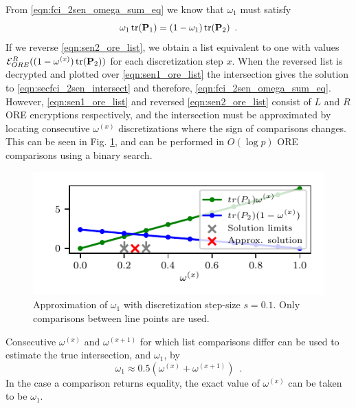 \documentclass[letterpaper, 10 pt, conference]{ieeeconf}  %
\begin{document}
From \eqref{eqn:fci_2sen_omega_sum_eq} we know that $\omega_1$ must satisfy
\begin{equation}
   \omega_1 \operatorname{tr}({{\mathbf{P}}}_1) = (1-\omega_1)\operatorname{tr}({{\mathbf{P}}}_2)\enspace. \label{eqn:secfci_2sen_intersect}
\end{equation}
If we reverse \eqref{eqn:sen2_ore_list}, we obtain a list equivalent to one with values $\mathcal{E}^R_{ORE}((1-\omega^{(x)})\operatorname{tr}({{\mathbf{P}}}_2))$ for each discretization step $x$. When the reversed list is decrypted and plotted over \eqref{eqn:sen1_ore_list} the intersection gives the solution to \eqref{eqn:secfci_2sen_intersect} and therefore, \eqref{eqn:fci_2sen_omega_sum_eq}. However, \eqref{eqn:sen1_ore_list} and reversed \eqref{eqn:sen2_ore_list} consist of $L$ and $R$ ORE encryptions respectively, and the intersection must be approximated by locating consecutive $\omega^{(x)}$ discretizations where the sign of comparisons changes. This can be seen in Fig. \ref{fig:2_sensor_sol}, and can be performed in $O(\log{p})$ ORE comparisons using a binary search.
\begin{figure}[tb]
   \vspace{-5pt}
   \begin{center}
      \includegraphics{images/2_sensors.pdf}
   \end{center}
   \vspace{-15pt}
   \caption{Approximation of $\omega_1$ with discretization step-size $s=0.1$. Only comparisons between line points are used.}
   \vspace{-\baselineskip}
   \label{fig:2_sensor_sol}
\end{figure}
Consecutive $\omega^{(x)}$ and $\omega^{(x+1)}$ for which list comparisons differ can be used to estimate the true intersection, and $\omega_1$, by
\begin{equation}
   \omega_1 \approx 0.5(\omega^{(x)} + \omega^{(x+1)})\enspace. \label{eqn:secfci_2sen_omega}
\end{equation}
In the case a comparison returns equality, the exact value of $\omega^{(x)}$ can be taken to be $\omega_1$.
\end{document}
